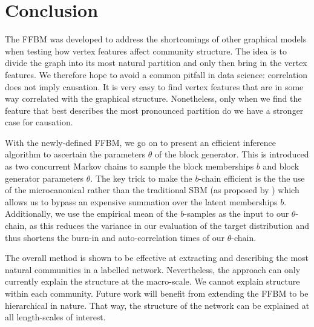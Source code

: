 \section{Conclusion}

The FFBM was developed to address the shortcomings of other graphical models when testing how vertex features affect community structure. The idea is to divide the graph into its most natural partition and only then bring in the vertex features. We therefore hope to avoid a common pitfall in data science: correlation does not imply causation. It is very easy to find vertex features that are in some way correlated with the graphical structure. Nonetheless, only when we find the feature that best describes the most pronounced partition do we have a stronger case for causation.

With the newly-defined FFBM, we go on to present an efficient inference algorithm to ascertain the parameters $\theta$ of the block generator. This is introduced as two concurrent Markov chains to sample the block memberships $b$ and block generator parameters $\theta$. The key trick to make the $b$-chain efficient is the the use of the microcanonical rather than the traditional SBM (as proposed by \citet{Peixoto-Bayesian-Microcanonical}) which allows us to bypass an expensive summation over the latent memberships $b$. Additionally, we use the empirical mean of the $b$-samples as the input to our $\theta$-chain, as this reduces the variance in our evaluation of the target distribution and thus shortens the burn-in and auto-correlation times of our $\theta$-chain.

The overall method is shown to be effective at extracting and describing the most natural communities in a labelled network. Nevertheless, the approach can only currently explain the structure at the macro-scale. We cannot explain structure within each community. Future work will benefit from extending the FFBM to be hierarchical in nature. That way, the structure of the network can be explained at all length-scales of interest.